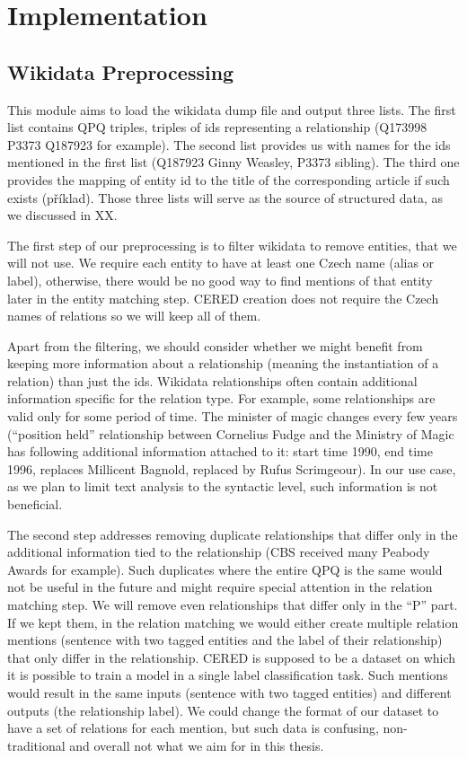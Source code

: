 \section{Implementation}



\subsection{Wikidata Preprocessing}
\label{sec:wikidata_preprocessing}
This module aims to load the wikidata dump file and output three lists. The first list contains QPQ triples, triples of ids representing a relationship (Q173998 P3373 Q187923 for example). The second list provides us with names for the ids mentioned in the first list (Q187923 Ginny Weasley, P3373 sibling). The third one provides the mapping of entity id to the title of the corresponding article if such exists (příklad). Those three lists will serve as the source of structured data, as we discussed in XX.

The first step of our preprocessing is to filter wikidata to remove entities, that we will not use. We require each entity to have at least one Czech name (alias or label), otherwise, there would be no good way to find mentions of that entity later in the entity matching step. CERED creation does not require the Czech names of relations so we will keep all of them.

Apart from the filtering, we should consider whether we might benefit from keeping more information about a relationship (meaning the instantiation of a relation) than just the ids. Wikidata relationships often contain additional information specific for the relation type. For example, some relationships are valid only for some period of time. The minister of magic changes every few years (“position held” relationship between Cornelius Fudge and the Ministry of Magic has following additional information attached to it: start time 1990, end time 1996, replaces Millicent Bagnold, replaced by Rufus Scrimgeour). In our use case, as we plan to limit text analysis to the syntactic level, such information is not beneficial. 

The second step addresses removing duplicate relationships that differ only in the additional information tied to the relationship (CBS received many Peabody Awards for example). Such duplicates where the entire QPQ is the same would not be useful in the future and might require special attention in the relation matching step. We will remove even relationships that differ only in the “P” part. If we kept them, in the relation matching we would either create multiple relation mentions (sentence with two tagged entities and the label of their relationship) that only differ in the relationship. CERED is supposed to be a dataset on which it is possible to train a model in a single label classification task. Such mentions would result in the same inputs (sentence with two tagged entities) and different outputs (the relationship label). We could change the format of our dataset to have a set of relations for each mention, but such data is confusing, non-traditional and overall not what we aim for in this thesis. 


